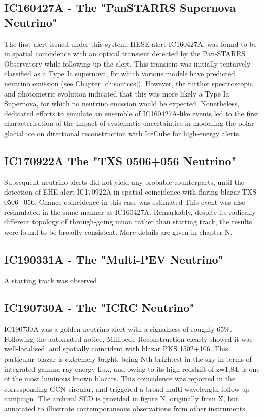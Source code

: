 \subsection{IC160427A - The "PanSTARRS Supernova Neutrino"}

The first alert issued under this system, HESE alert IC160427A, was found to be in spatial coincidence with an optical transient detected by the Pan-STARRS Observatory while following up the alert. This transient was initially tentaively classified as a Type Ic supernova, for which various models have predicted neutrino emission (see Chapter \ref{ch:sources}).  However, the further spectroscopic and photometric evolution indicated that this was  more likely a Type Ia Supernova, for which no neutrino emission would be expected. Nonetheless, dedicated efforts to simulate an ensemble of IC160427A-like events led to the first characterisation of the impact of systematic uncertainties in modelling the polar glacial ice on directional reconstruction with IceCube for high-energy alerts. 

\subsection{IC170922A The "TXS 0506+056 Neutrino"}
Subsequent neutrino alerts did not yield any probable counterparts, until the detection of EHE alert IC170922A in spatial coincidence with flaring blazar TXS 0506+056. Chance coincidence in this case was estimated  This event was also resimulated in the same manner as IC160427A. Remarkably, despite its radically-different topology of through-going muon rather than starting track, the results were found to be broadly consistent. More details are given in chapter N.

\subsection{IC190331A - The "Multi-PEV Neutrino"}

A starting track was observed 

\subsection{IC190730A - The "ICRC Neutrino"}

IC190730A was a golden neutrino alert with a signalness of roughly 65\%. Following the automated notice, Millipede Reconstruction clearly showed it was well-localised, and spatially coincident with blazar PKS 1502+106. This particular blazar is extremely bright, being Nth brightest in the sky in terms of integrated gamma-ray energy flux, and owing to its high redshift of z=1.84, is one of the most luminous known blazars. This coincidence was reported in the corresponding GCN circular, and triggered a broad multi-wavelength follow-up campaign. The archival SED is provided in figure N, originally from X, but annotated to illustrate contemporaneous observations from other instruments.

